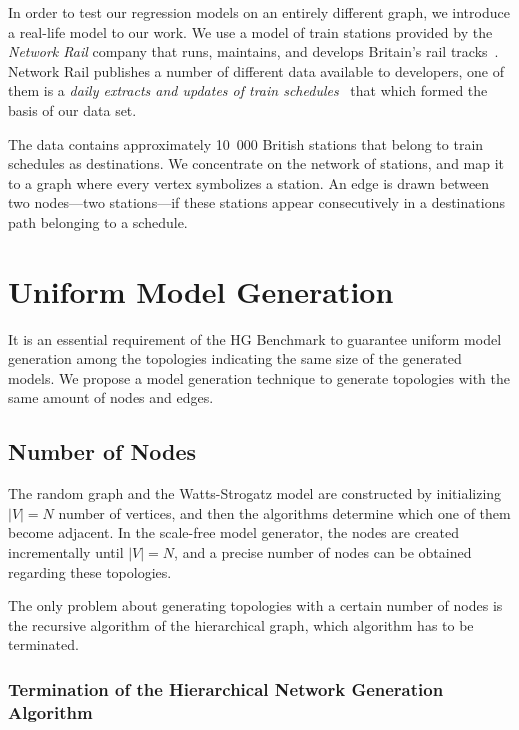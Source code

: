 In order to test our regression models on an entirely different graph, we introduce a real-life model to our work. We use a model of train stations provided by the \textit{Network Rail} company that runs, maintains, and develops Britain's rail tracks~\cite{network_rail}. Network Rail publishes a number of different data available to developers, one of them is a \textit{daily extracts and updates of train schedules}~\cite{schedules_data} that which formed the basis of our data set.

The data contains approximately 10~000 British stations that belong to train schedules as destinations. We concentrate on the network of stations, and map it to a graph where every vertex symbolizes a station. An edge is drawn between two nodes---\ie two stations---if these stations appear consecutively in a destinations path belonging to a schedule.

\section{Uniform Model Generation}\label{sec:uniform_generation}

It is an essential requirement of the HG Benchmark to guarantee uniform model generation among the topologies indicating the same size of the generated models. We propose a model generation technique to generate topologies with the same amount of nodes and edges.

\subsection{Number of Nodes}

The random graph and the Watts-Strogatz model are constructed by initializing $|V| = N$ number of vertices, and then the algorithms determine which one of them become adjacent. In the scale-free model generator, the nodes are created incrementally until $|V| = N$, and a precise number of nodes can be obtained regarding these topologies.

The only problem about generating topologies with a certain number of nodes is the recursive algorithm of the hierarchical graph, which algorithm has to be terminated.

\subsubsection{Termination of the Hierarchical Network Generation Algorithm}\label{sec:hierarcical_contribution}

